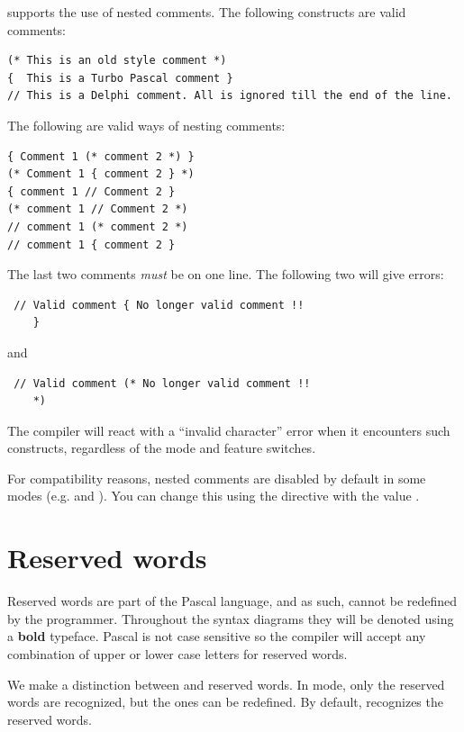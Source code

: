 \fpc supports the use of nested comments. The following constructs are valid
comments:
\begin{verbatim}
(* This is an old style comment *)
{  This is a Turbo Pascal comment }
// This is a Delphi comment. All is ignored till the end of the line.
\end{verbatim}
The following are valid ways of nesting comments:
\begin{verbatim}
{ Comment 1 (* comment 2 *) }
(* Comment 1 { comment 2 } *)
{ comment 1 // Comment 2 }
(* comment 1 // Comment 2 *)
// comment 1 (* comment 2 *)
// comment 1 { comment 2 }
\end{verbatim}
The last two comments {\em must} be on one line. The following two will give
errors:
\begin{verbatim}
 // Valid comment { No longer valid comment !!
    }
\end{verbatim}
and
\begin{verbatim}
 // Valid comment (* No longer valid comment !!
    *)
\end{verbatim}
The compiler will react with a ``invalid character'' error when it encounters
such constructs, regardless of the mode and feature switches.

\begin{remark}
For compatibility reasons, nested comments are disabled by default in some modes (e.g.  and ).
You can change this using the  directive with the value .
\end{remark}

\section{Reserved words}
Reserved words are part of the Pascal language, and as such, cannot be redefined
by the programmer. Throughout the syntax diagrams they will be denoted using
a {\sffamily\bfseries bold} typeface. Pascal is not case sensitive so the compiler
will accept any combination of upper or lower case letters for reserved words.

We make a distinction between \tp and \delphi reserved words. In  mode,
only the \tp reserved words are recognized, but the \delphi ones can be redefined.
By default, \fpc recognizes the \delphi reserved words.

